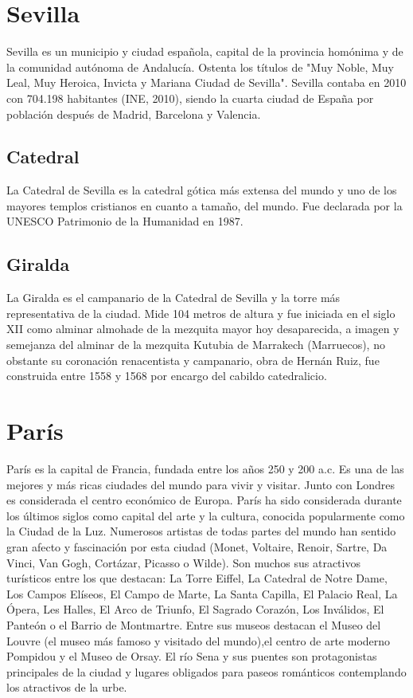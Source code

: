 \documentclass[10pt,letterpaper,oneside]{book}
\begin{document}
        \section{Sevilla}
            Sevilla es un municipio y ciudad española, capital de la 
            provincia homónima y de la comunidad autónoma de Andalucía. 
            Ostenta los títulos de "Muy Noble, Muy Leal, Muy Heroica, 
            Invicta y Mariana Ciudad de Sevilla". Sevilla contaba en 
            2010 con 704.198 habitantes (INE, 2010), siendo la cuarta 
            ciudad de España por población después de Madrid, Barcelona 
            y Valencia.
 
            \subsection*{Catedral}
                La Catedral de Sevilla es la catedral gótica más 
                extensa del mundo y uno de los mayores templos 
                cristianos en cuanto a tamaño, del mundo. Fue declarada 
                por la UNESCO Patrimonio de la Humanidad en 1987.
 
            \subsection*{Giralda}
                La Giralda es el campanario de la Catedral de Sevilla 
                y la torre más representativa de la ciudad. Mide 104 
                metros de altura y fue iniciada en el siglo XII como 
                alminar almohade de la mezquita mayor hoy desaparecida, 
                a imagen y semejanza del alminar de la mezquita Kutubia 
                de Marrakech (Marruecos), no obstante su coronación 
                renacentista y campanario, obra de Hernán Ruiz, fue 
                construida entre 1558 y 1568 por encargo del cabildo 
                catedralicio.
		\section{París}
			París es la capital de Francia, fundada entre los años 250 y 200 a.c. Es una de las mejores y más ricas ciudades del mundo para vivir y visitar. Junto con Londres es considerada el centro económico de Europa. París ha sido considerada durante los últimos siglos como capital del arte y la cultura, conocida popularmente como la Ciudad de la Luz. Numerosos artistas de todas partes del mundo han sentido gran afecto y fascinación por esta ciudad (Monet, Voltaire, Renoir, Sartre, Da Vinci, Van Gogh, Cortázar, Picasso o Wilde). Son muchos sus atractivos turísticos entre los que destacan: La Torre Eiffel, La Catedral de Notre Dame, Los Campos Elíseos, El Campo de Marte, La Santa Capilla, El Palacio Real, La Ópera, Les Halles, El Arco de Triunfo, El Sagrado Corazón, Los Inválidos, El Panteón o el Barrio de Montmartre. Entre sus museos destacan el Museo del Louvre (el museo más famoso y visitado del mundo),el centro de arte moderno Pompidou y el Museo de Orsay. El río Sena y sus puentes son protagonistas principales de la ciudad y lugares obligados para paseos románticos contemplando los atractivos de la urbe.
\end{document}
